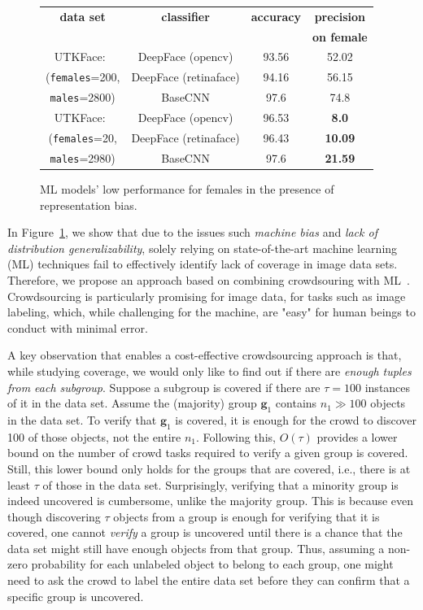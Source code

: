 \documentclass[11pt]{article}
\newcommand{\gee}{\mathbf{g}}
\begin{document}
\begin{figure}
\centering
\vspace{-3mm}
\scriptsize
\begin{tabular}{|@{}c|@{}c@{}|@{}c@{}|@{}c@{}|} 
 \hline
{\bf data set} & {\bf classifier} & {\bf accuracy} & {\bf precision} \\ 
 &  &  & {\bf on female} \\ \hline
UTKFace:~& DeepFace (opencv) & 93.56 & {52.02}\\\cline{2-4}
({\tt females}=200,& DeepFace (retinaface) & 94.16 & {56.15}\\\cline{2-4}
{\tt males}=2800) & BaseCNN & 97.6 & 74.8\\
\hline
UTKFace:~& DeepFace (opencv) & 96.53 & {\bf 8.0}\\\cline{2-4}
({\tt females}=20,& DeepFace (retinaface) & 96.43 & {\bf 10.09}\\\cline{2-4}
{\tt males}=2980)& BaseCNN & 97.6 & {\bf 21.59}\\
\hline
\end{tabular}
\vspace{-3mm}
\caption{\small ML models' low performance for females in the presence of representation bias.~\cite{mousavi2024data}}\label{fig:mlfails}
\vspace{-3mm}
\end{figure}

In Figure~\ref{fig:mlfails}, we show that due to the issues such {\it machine bias} and {\it lack of distribution generalizability},
solely relying on state-of-the-art machine learning (ML) techniques fail to effectively identify lack of coverage in image data sets. Therefore, we propose an approach based on combining crowdsouring with ML~\cite{mousavi2024data}. 
Crowdsourcing is particularly promising for image data, for tasks such as image labeling, which, while challenging for the machine, are "easy" for human beings to conduct with minimal error. 

A key observation that enables a cost-effective crowdsourcing approach is that, while studying coverage, we would only like to find out if there are {\it enough tuples from each subgroup}.
Suppose a subgroup is covered if there are $\tau=100$ instances of it in the data set. Assume the (majority) group $\gee_1$ contains $n_1 \gg 100$ objects in the data set. 
To verify that $\gee_1$ is covered, it is enough for the crowd to discover 100 of those objects, not the entire $n_1$. 
Following this, $O(\tau)$ provides a lower bound on the number of crowd tasks required to verify a given group is covered. 
Still, this lower bound only holds for the groups that are covered, i.e., there is at least $\tau$ of those in the data set.
Surprisingly, verifying that a minority group is indeed uncovered is cumbersome, unlike the majority group.
This is because even though discovering $\tau$ objects from a group is enough for verifying that it is covered, one cannot {\it verify} a group is uncovered until there is a chance that the data set might still have enough objects from that group. Thus, assuming a non-zero probability for each unlabeled object to belong to each group, {one might need to ask the crowd to label the entire data set before they can confirm that a specific group is uncovered}.
\end{document}

